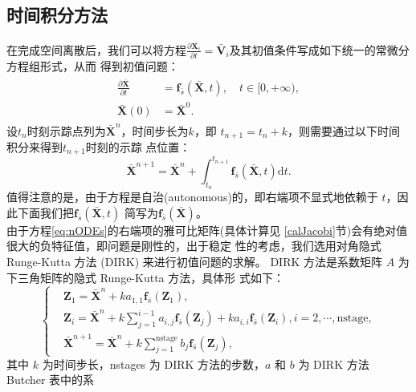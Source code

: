 \documentclass[a4paper,twoside]{ctexart}
\newcommand{\pdfrac}[2]{\frac{\partial #1}{\partial #2}}
\begin{document}
  \subsection{时间积分方法}
  \label{sec:timeintegral}
  在完成空间离散后，我们可以将方程$\pdfrac{\bar{\boldsymbol X_i}}{t} =
  \bar{\boldsymbol V}_i$及其初值条件写成如下统一的常微分方程组形式，从而
  得到初值问题：
  \begin{eqnarray}
  \begin{aligned}
  \pdfrac{\bar{\boldsymbol X}}{t} &=
  \boldsymbol f_{\bar{s}}(\bar{\boldsymbol X},t),\quad t\in[0,+\infty),\\
  \bar{\boldsymbol X}(0) &= \bar{\boldsymbol X}^0.
  \label{eq:nODEs}
  \end{aligned}
  \end{eqnarray}
  设$t_n$时刻示踪点列为$\bar{\boldsymbol X}^n$，时间步长为$k$，即
  $t_{n+1} = t_n + k$，则需要通过以下时间积分来得到$t_{n+1}$时刻的示踪
  点位置：
  \begin{equation}
    \label{eq:exintegral}
    \bar{\boldsymbol X}^{n+1} = \bar{\boldsymbol X}^n + \int_{t_n}^{t_{n+1}}\boldsymbol f_{\bar{s}}(\bar{\boldsymbol X},t)\text{d}t.
  \end{equation}
  值得注意的是，由于方程是自治(autonomous)的，即右端项不显式地依赖于
  $t$，因此下面我们把$\boldsymbol f_{\bar{s}}(\bar{\boldsymbol X},t)$
  简写为$\boldsymbol f_{\bar{s}}(\bar{\boldsymbol X})$。\\
  \indent 由于方程\eqref{eq:nODEs}的右端项的雅可比矩阵(具体计算见
  \ref{calJacobi}节)会有绝对值很大的负特征值，即问题是刚性的，出于稳定
  性的考虑，我们选用对角隐式 Runge-Kutta 方法 (DIRK) 来进行初值问题的求解。
  DIRK 方法是系数矩阵 $A$ 为下三角矩阵的隐式 Runge-Kutta 方法，具体形
  式如下：
  \begin{equation}
    \label{eq:DIRK}
  \left\{
\begin{aligned}
 &\boldsymbol Z_1= \bar{\boldsymbol X}^n + ka_{1,1} \boldsymbol f_{\bar{s}}(\boldsymbol Z_1), \\
 &\boldsymbol Z_i= \bar{\boldsymbol X}^n + k{\textstyle \sum_{j=1}^{i-1}}a_{i,j}
 \boldsymbol f_{\bar{s}}(\boldsymbol
 Z_j)+ka_{i,i}\boldsymbol f_{\bar{s}}(\boldsymbol Z_i),i =
 2,\cdots,\text{nstage},\\
 &\bar{\boldsymbol X}^{n+1} = \bar{\boldsymbol X}^n + k{\textstyle
   \sum_{j=1}^{\text{nstage}}}b_j\boldsymbol f_{\bar{s}}(\boldsymbol Z_j),
\end{aligned}
\right.
\end{equation}
其中 $k$ 为时间步长，nstages 为 DIRK 方法的步数，$a$ 和 $b$ 为 DIRK 方法 Butcher 表中的系
\end{document}
